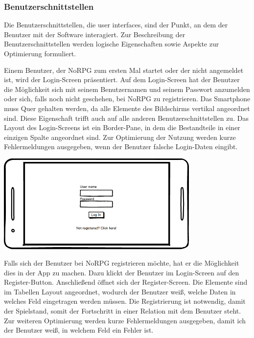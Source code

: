 		
		\subsubsection{Benutzerschnittstellen}
			Die Benutzerschnittstellen, die user interfaces, sind der Punkt, an dem der Benutzer mit der Software interagiert. Zur Beschreibung der Benutzerschnittstellen werden logische Eigenschaften sowie Aspekte zur Optimierung formuliert.
			
			Einem Benutzer, der NoRPG zum ersten Mal startet oder der nicht angemeldet ist, wird der Login-Screen präsentiert. Auf dem Login-Screen hat der Benutzer die Möglichkeit sich mit seinem Benutzernamen und seinem Passwort anzumelden oder sich, falls noch nicht geschehen, bei NoRPG zu registrieren. Das Smartphone muss Quer gehalten werden, da alle Elemente des Bildschirms vertikal angeordnet sind. Diese Eigenschaft trifft auch auf alle anderen Benutzerschnittstellen zu. Das Layout des Login-Screens ist ein Border-Pane, in dem die Bestandteile in einer einzigen Spalte angeordnet sind. Zur Optimierung der Nutzung werden kurze Fehlermeldungen ausgegeben, wenn der Benutzer falsche Login-Daten eingibt.
			\begin{center}
				\includegraphics[width=10cm]{pics/Login_Mockup.png}
			\end{center}
			
			Falls sich der Benutzer bei NoRPG registrieren möchte, hat er die Möglichkeit dies in der App zu machen. Dazu klickt der Benutzer im Login-Screen auf den Register-Button. Anschließend öffnet sich der Register-Screen. Die Elemente sind im Tabellen Layout angeordnet, wodurch der Benutzer weiß, welche Daten in welches Feld eingetragen werden müssen. Die Registrierung ist notwendig, damit der Spielstand, somit der Fortschritt in einer Relation mit dem Benutzer steht. Zur weiteren Optimierung werden kurze Fehlermeldungen ausgegeben, damit ich der Benutzer weiß, in welchem Feld ein Fehler ist.
			

